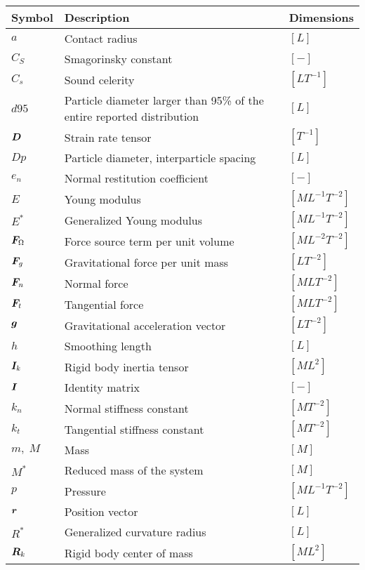 
\listofsymbols

\begin{longtable}{l|l|l}

Symbol & Description & Dimensions  \\ \hline
$a$ & Contact radius & $[L]$ \\
$C_S$ & Smagorinsky constant & $[-]$ \\
$C_s$ & Sound celerity & $[LT^{-1}]$ \\
$d95$ & Particle diameter larger than 95\% of the entire reported distribution & $[L]$ \\
$\boldsymbol{D}$ & Strain rate tensor & $[T^{-1}]$ \\
$Dp$ & Particle diameter, interparticle spacing & $[L]$ \\
$e_n$ & Normal restitution coefficient & $[-]$ \\
$E$ & Young modulus & $[ML^{-1}T^{-2}]$ \\
$E^*$ & Generalized Young modulus & $[ML^{-1}T^{-2}]$ \\
$\boldsymbol{F}_\Omega$ & Force source term per unit volume & $[ML^{-2}T^{-2}]$ \\
$\boldsymbol{F}_g$ & Gravitational force per unit mass & $[LT^{-2}]$ \\
$\boldsymbol{F}_n$ & Normal force & $[MLT^{-2}]$ \\
$\boldsymbol{F}_t$ & Tangential force & $[MLT^{-2}]$ \\
$\boldsymbol{g}$ & Gravitational acceleration vector & $[LT^{-2}]$ \\
$h$ & Smoothing length & $[L]$ \\
$\boldsymbol{I}_k$ & Rigid body inertia tensor & $[ML^{2}]$ \\
$\boldsymbol{I}$ & Identity matrix & $[-]$ \\
$k_n$ & Normal stiffness constant & $[MT^{-2}]$ \\
$k_t$ & Tangential stiffness constant & $[MT^{-2}]$ \\
$m,\;M$ & Mass & $[M]$ \\
$M^*$ & Reduced mass of the system & $[M]$ \\
$p$ & Pressure & $[ML^{-1}T^{-2}]$ \\
$\boldsymbol{r}$ & Position vector & $[L]$ \\
$R^*$ & Generalized curvature radius & $[L]$ \\
$\boldsymbol{R}_k$ & Rigid body center of mass & $[ML^{2}]$ \\

\end{longtable}
